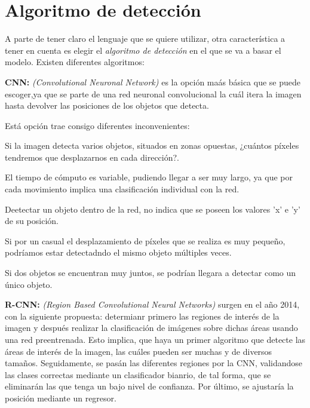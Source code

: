 \section{Algoritmo de detección}
A parte de tener claro el lenguaje que se quiere utilizar, otra característica a tener en cuenta es elegir el \textit{algoritmo de detección} en el que se va a basar el modelo.
Existen diferentes algoritmos:
\begin{list}{\textbullet}{ %
    \addtolength{\itemsep}{-2mm} %
    \setlength{\itemindent}{2mm}}

    \item \textbf{CNN:} \textit{(Convolutional Neuronal Network)} es la opción maás básica que se puede escoger,ya que se parte de una red neuronal convolucional \cite{cnn} la cuál itera la imagen hasta devolver las posiciones de los objetos que detecta.
    
    Está opción trae consigo diferentes inconvenientes:
    \begin{list}{\textbullet}{ %
        \addtolength{\itemsep}{-2mm} %
        \setlength{\itemindent}{2mm}}
        \item Si la imagen detecta varios objetos, situados en zonas opuestas, ¿cuántos píxeles tendremos que desplazarnos en cada dirección?.
        \item El tiempo de cómputo es variable, pudiendo llegar a ser muy largo, ya que por cada movimiento implica una clasificación individual con la red.
        \item Deetectar un objeto dentro de la red, no indica que se poseen los valores 'x' e 'y' de su posición.
        \item Si por un casual el desplazamiento de píxeles que se realiza es muy pequeño, podríamos estar detectadndo el mismo objeto múltiples veces.
        \item Si dos objetos se encuentran muy juntos, se podrían llegara a detectar como un único objeto.    
    \end{list}
    
    \item \textbf{R-CNN:} \textit{(Region Based Convolutional Neural Networks)} surgen en el año 2014, con la siguiente propuesta: determianr primero las regiones de interés de la imagen y después realizar la clasificación de imágenes sobre dichas áreas usando una red preentrenada.\cite{r-cnn}
    Esto implica, que haya un primer algoritmo que detecte las áreas de interés de la imagen, las cuáles pueden ser muchas y de diversos tamaños. Seguidamente, se pasán las diferentes regiones por la CNN, validandose las clases correctas mediante un clasificador bianrio, de tal forma, que se eliminarán
    las que tenga un bajo nivel de confianza. Por último, se ajustaría la posición mediante un regresor.
    

\end{list}
